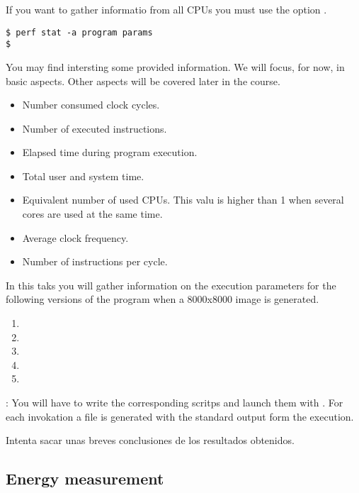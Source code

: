 If you want to gather informatio from all CPUs you must use the option .

\begin{lstlisting}[style=terminal]
$ perf stat -a program params
$
\end{lstlisting}

You may find intersting some provided information.
We will focus, for now, in basic aspects.
Other aspects will be covered later in the course.

\begin{itemize}
  \item Number consumed clock cycles.
  \item Number of executed instructions.
  \item Elapsed time during program execution.
  \item Total user and system time.
  \item Equivalent number of used CPUs. This valu is higher than 1 when several cores are used
        at the same time.
  \item Average clock frequency.
  \item Number of instructions per cycle.
\end{itemize}

In this taks you will gather information on the execution parameters for the 
following versions of the program when a 8000x8000 image is generated.

\begin{enumerate}
  \item {}
  \item {}
  \item {}
  \item {}
  \item {}
\end{enumerate}

: 
You will have to write the corresponding scritps and launch them with .
For each  invokation a  file is generated
with the standard output form the execution.

Intenta sacar unas breves conclusiones de los resultados obtenidos.

\subsection{Energy measurement}

